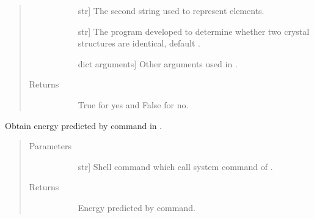 \documentclass[letterpaper,10pt,english]{sphinxmanual}
\begin{document}
\begin{fulllineitems}
\begin{fulllineitems}
\begin{quote}
\begin{description}
\begin{description}
\item[{}] \leavevmode{[}str{]}
The second string used to represent elements.

\item[{}] \leavevmode{[}str{]}
The program developed to determine whether two
crystal structures are identical, default .

\item[{}] \leavevmode{[}dict arguments{]}
Other arguments used in .

\end{description}

\item[{Returns}] \leavevmode\begin{description}
\item[{}] \leavevmode
True for yes and False for no.

\end{description}

\end{description}\end{quote}

\end{fulllineitems}


\begin{fulllineitems}
\label{\detokenize{pygace:pygace.ce.CE.corrdump}}
Obtain energy predicted by  command in .
\begin{quote}\begin{description}
\item[{Parameters}] \leavevmode\begin{description}
\item[{}] \leavevmode{[}str{]}
Shell command which call system  command of .

\end{description}

\item[{Returns}] \leavevmode\begin{description}
\item[{}] \leavevmode
Energy predicted by  command.


\end{description}
\end{description}
\end{quote}
\end{fulllineitems}
\end{fulllineitems}
\end{document}
